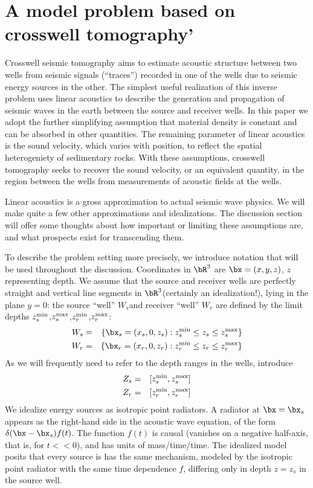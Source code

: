 \section{A model problem based on crosswell tomography'}

Crosswell seismic tomography  aims to  estimate acoustic structure between
two wells from seismic signals (``traces'') recorded in one of the wells due to seismic
energy sources in the other. The simplest useful realization of this
inverse problem uses linear acoustics to describe the generation and
propagation of seismic waves in the earth between the source and
receiver wells. In this paper we adopt the further simplifying
assumption that material density is constant and can be absorbed in
other quantities. The remaining parameter of linear acoustics is the
sound velocity, which varies with position, to reflect the
spatial heterogeniety of sedimentary rocks. With these assumptions,
crosswell tomography seeks to recover the sound velocity, or an
equivalent quantity, in the region
between the wells from measurements of acoustic fields at the wells.

Linear acoustics is a gross approximation to actual seismic wave
physics. We will make quite a few other approximations and
idealizations. The discussion section will offer some thoughts about
how important or limiting these assumptions are, and what prospects
exist for transcending them. 

To describe the problem setting more precisely, we introduce
notation that will be used throughout the discussion. Coordinates in
$\bR^3$ are $\bx=(x,y,z)$, $z$ representing depth. We assume that the
source and receiver wells are 
perfectly straight and vertical line segments in $\bR^3$(certainly an
idealization!), lying in the plane $y=0$: the
source ``well'' $W_s$and receiver ``well'' $W_r$ are defined by the
limit depths $z_s^{\rm min}$,$z_s^{\rm max}$,$z_r^{\rm min}$,$z_r^{\rm
  max}$: 
\begin{eqnarray}
\label{eqn:wells} 
W_s & = & \{\bx_s = (x_s,0,z_s): z_s^{\rm min} \le z_s \le z_s^{\rm 
          max}\} \nonumber \\
W_r & = & \{\bx_r = (x_r,0,z_r): z_r^{\rm min} \le z_r \le z_r^{\rm 
          max}\} 
\end{eqnarray}
As we will frequently need to refer to the depth ranges in the wells,
introduce
\begin{eqnarray}
\label{eqn:depths} 
Z_s & = & [z_s^{\rm min}, z_s^{\rm max}] \nonumber \\
Z_r & = & [z_r^{\rm min},z_r^{\rm max}] 
\end{eqnarray}
We idealize energy sources as isotropic point radiators. A radiator at
$\bx=\bx_s$ appears as the right-hand side in the acoustic wave
equation, of the form $\delta(\bx-\bx_s)f(t)$. 
The function $f(t)$ is causal (vanishes on a negative half-axis, that
is,  for $t<<0$), and has units of
mass/time/time. The idealized model posits that every
source is has the same mechanism, modeled by the
isotropic point radiator with the same time dependence $f$, differing only in
depth $z=z_s$ in the source well.

